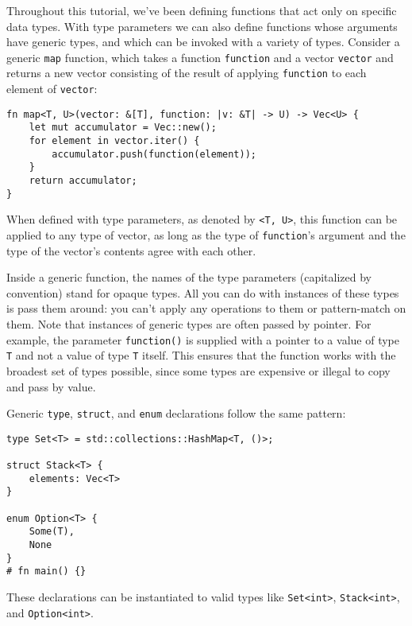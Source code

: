 \documentclass[]{article}
\begin{document}

Throughout this tutorial, we've been defining functions that act only on
specific data types. With type parameters we can also define functions
whose arguments have generic types, and which can be invoked with a
variety of types. Consider a generic \texttt{map} function, which takes
a function \texttt{function} and a vector \texttt{vector} and returns a
new vector consisting of the result of applying \texttt{function} to
each element of \texttt{vector}:

\begin{verbatim}
fn map<T, U>(vector: &[T], function: |v: &T| -> U) -> Vec<U> {
    let mut accumulator = Vec::new();
    for element in vector.iter() {
        accumulator.push(function(element));
    }
    return accumulator;
}
\end{verbatim}

When defined with type parameters, as denoted by
\texttt{\textless{}T, U\textgreater{}}, this function can be applied to
any type of vector, as long as the type of \texttt{function}'s argument
and the type of the vector's contents agree with each other.

Inside a generic function, the names of the type parameters (capitalized
by convention) stand for opaque types. All you can do with instances of
these types is pass them around: you can't apply any operations to them
or pattern-match on them. Note that instances of generic types are often
passed by pointer. For example, the parameter \texttt{function()} is
supplied with a pointer to a value of type \texttt{T} and not a value of
type \texttt{T} itself. This ensures that the function works with the
broadest set of types possible, since some types are expensive or
illegal to copy and pass by value.

Generic \texttt{type}, \texttt{struct}, and \texttt{enum} declarations
follow the same pattern:

\begin{verbatim}
type Set<T> = std::collections::HashMap<T, ()>;

struct Stack<T> {
    elements: Vec<T>
}

enum Option<T> {
    Some(T),
    None
}
# fn main() {}
\end{verbatim}

These declarations can be instantiated to valid types like
\texttt{Set\textless{}int\textgreater{}},
\texttt{Stack\textless{}int\textgreater{}}, and
\texttt{Option\textless{}int\textgreater{}}.
\end{document}
